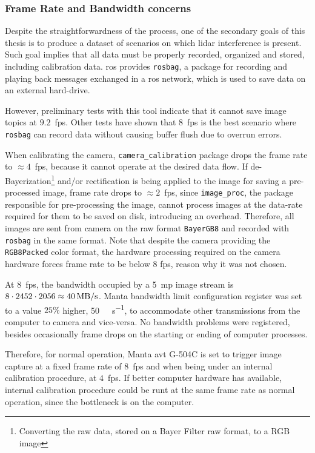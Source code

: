 \subsubsection{Frame Rate and Bandwidth concerns}
Despite the straightforwardness of the process, one of the secondary goals of this thesis is to produce a dataset of scenarios on which \ac{lidar} interference is present. Such goal implies that all data must be properly recorded, organized and stored, including calibration data. \ac{ros} provides \texttt{rosbag}, a package for recording and playing back messages exchanged in a \ac{ros} network, which is used to save data on an external hard-drive.

However, preliminary tests with this tool indicate that it cannot save image topics at $9.2$~\ac{fps}. Other tests have shown that $8$~\ac{fps} is the best scenario where \texttt{rosbag} can record data without causing buffer flush due to overrun errors. 

When calibrating the camera, \texttt{camera\_calibration} package drops the frame rate to $\approx 4$~\ac{fps}, because it cannot operate at the desired data flow. If de-Bayerization\footnote{Converting the raw data, stored on a Bayer Filter raw format, to a RGB image} and/or rectification is being applied to the image for saving a pre-processed image, frame rate drops to $\approx 2$~\ac{fps}, since \texttt{image\_proc}, the package responsible for pre-processing the image, cannot process images at the data-rate required for them to be saved on disk, introducing an overhead. Therefore, all images are sent from camera on the raw format \texttt{BayerGB8} and recorded with \texttt{rosbag} in the same format. Note that despite the camera providing  the \texttt{RGB8Packed} color format, the hardware processing required on the camera hardware forces frame rate to be below $8$ \ac{fps}, reason why it was not chosen.

At 8~\ac{fps}, the bandwidth occupied by a 5~\ac{mp} image stream is $8 \cdot 2452 \cdot 2056 \approx \SI[per-mode=symbol]{40}{\mega\byte\per\second}$. Manta bandwidth limit configuration register was set to a value $25\%$ higher, \SI[per-mode=symbol]{50}{\mega\byte\per\second}, to accommodate other transmissions from the computer to camera and vice-versa. No bandwidth problems were registered, besides occasionally frame drops on the starting or ending of computer processes.

Therefore, for normal operation, Manta \ac{avt} G-504C is set to trigger image capture at a fixed frame rate of $8$~\ac{fps} and when being under an internal calibration procedure, at $4$~\ac{fps}. If better computer hardware has available, internal calibration procedure could be runt at the same frame rate as normal operation, since the bottleneck is on the computer.

